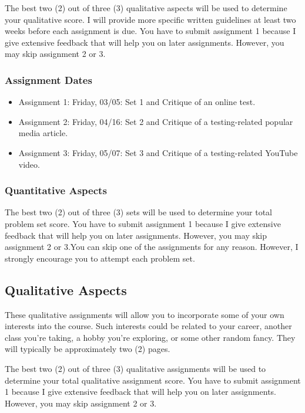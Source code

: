 \documentclass[11pt,]{article}
\begin{document}
The best two (2) out of three (3) qualitative aspects will be used to
determine your qualitative score. I will provide more specific written
guidelines at least two weeks before each assignment is due. You have to
submit assignment 1 because I give extensive feedback that will help you
on later assignments. However, you may skip assignment 2 or 3.

\hypertarget{assignment-dates}{%
\subsubsection{Assignment Dates}\label{assignment-dates}}

\begin{itemize}
\item
  Assignment 1: Friday, 03/05: Set 1 and Critique of an online test.
\item
  Assignment 2: Friday, 04/16: Set 2 and Critique of a testing-related
  popular media article.
\item
  Assignment 3: Friday, 05/07: Set 3 and Critique of a testing-related
  YouTube video.
\end{itemize}

\hypertarget{quantitative-aspects}{%
\subsubsection{Quantitative Aspects}\label{quantitative-aspects}}

The best two (2) out of three (3) sets will be used to determine your
total problem set score. You have to submit assignment 1 because I give
extensive feedback that will help you on later assignments. However, you
may skip assignment 2 or 3.You can skip one of the assignments for any
reason. However, I strongly encourage you to attempt each problem set.

\hypertarget{qualitative-aspects}{%
\subsection{Qualitative Aspects}\label{qualitative-aspects}}

These qualitative assignments will allow you to incorporate some of your
own interests into the course. Such interests could be related to your
career, another class you're taking, a hobby you're exploring, or some
other random fancy. They will typically be approximately two (2) pages.

The best two (2) out of three (3) qualitative assignments will be used
to determine your total qualitative assignment score. You have to submit
assignment 1 because I give extensive feedback that will help you on
later assignments. However, you may skip assignment 2 or 3.
\end{document}
